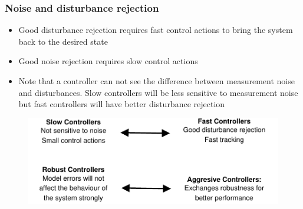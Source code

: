\begin{frame}
	\frametitle{Noise and disturbance rejection}
	\begin{block}{}
		\begin{itemize}
			\item Good disturbance rejection requires fast control actions to bring the system back to the desired state
			\item Good noise rejection requires slow control actions
			\item Note that a controller can not see the difference between measurement noise and disturbances. Slow controllers will be less sensitive to measurement noise but fast controllers will have better disturbance rejection
		\end{itemize}
	\end{block}
\end{frame}

\begin{frame}
	\begin{figure}
		\centering
		\includegraphics[width=1.1\linewidth]{comparison}
		\caption{}
		\label{fig:comparison}
	\end{figure}
\end{frame}